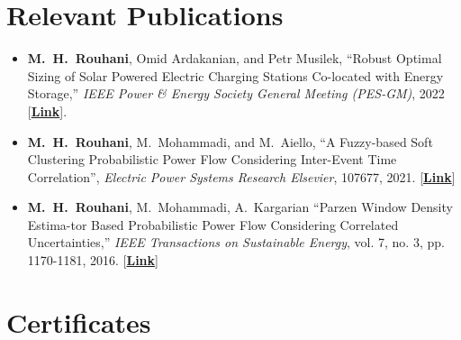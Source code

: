 \documentclass[11pt,a4paper,sans]{moderncv} %
\begin{document}
	\section{Relevant Publications}
	\begin{itemize}
		\item \textbf{M.~H.~Rouhani}, Omid Ardakanian, and Petr Musilek, ``Robust Optimal Sizing of Solar Powered Electric Charging Stations Co-located with Energy Storage,'' \textit{IEEE Power \&  Energy Society General Meeting (PES-GM)}, 2022 [\href{http://webdocs.cs.ualberta.ca/~oardakan/files/PESGM22.pdf}{\textbf{Link}}].
		
		
		\item \textbf{M.~H.~Rouhani}, M.~Mohammadi, and M.~Aiello, ``A Fuzzy-based Soft Clustering Probabilistic Power Flow Considering Inter-Event Time Correlation'', \textit{Electric Power Systems Research Elsevier}, 107677,  2021. [\href{https://www.sciencedirect.com/science/article/pii/S0378779621006581}{\textbf{Link}}]
		
		
		\item  \textbf{M.~H.~Rouhani}, M.~Mohammadi, A.~Kargarian ``Parzen Window Density Estima-tor Based Probabilistic Power Flow Considering Correlated Uncertainties,'' \textit{IEEE Transactions on Sustainable Energy}, vol. 7, no. 3, pp. 1170-1181, 2016. [\href{https://ieeexplore.ieee.org/abstract/document/7434076}{\textbf{Link}}]
		
	\end{itemize}
	
	\section{Certificates}
    			
\end{document}
